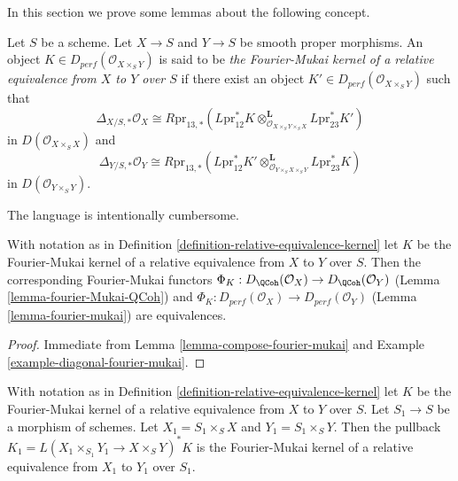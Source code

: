\noindent
In this section we prove some lemmas about the following concept.

\begin{definition}
\label{definition-relative-equivalence-kernel}
Let $S$ be a scheme. Let $X \to S$ and $Y \to S$ be smooth proper morphisms.
An object $K \in D_{perf}(\mathcal{O}_{X \times_S Y})$
is said to be {\it the Fourier-Mukai kernel of a relative equivalence
from $X$ to $Y$ over $S$}
if there exist an object $K' \in D_{perf}(\mathcal{O}_{X \times_S Y})$
such that
$$
\Delta_{X/S, *}\mathcal{O}_X \cong
R\text{pr}_{13, *}(L\text{pr}_{12}^*K
\otimes_{\mathcal{O}_{X \times_S Y \times_S X}}^\mathbf{L}
L\text{pr}_{23}^*K')
$$
in $D(\mathcal{O}_{X \times_S X})$ and
$$
\Delta_{Y/S, *}\mathcal{O}_Y \cong
R\text{pr}_{13, *}(L\text{pr}_{12}^*K'
\otimes_{\mathcal{O}_{Y \times_S X \times_S Y}}^\mathbf{L}
L\text{pr}_{23}^*K)
$$
in $D(\mathcal{O}_{Y \times_S Y})$.
\end{definition}

\noindent
The language is intentionally cumbersome.

\begin{lemma}
\label{lemma-equivalences-rek}
With notation as in Definition \ref{definition-relative-equivalence-kernel}
let $K$ be the Fourier-Mukai kernel of a relative equivalence from $X$
to $Y$ over $S$. Then the corresponding Fourier-Mukai functors
$\Phi_K : D_\QCoh(\mathcal{O}_X) \to D_\QCoh(\mathcal{O}_Y)$
(Lemma \ref{lemma-fourier-Mukai-QCoh})
and $\Phi_K : D_{perf}(\mathcal{O}_X) \to D_{perf}(\mathcal{O}_Y)$
(Lemma \ref{lemma-fourier-mukai})
are equivalences.
\end{lemma}

\begin{proof}
Immediate from Lemma \ref{lemma-compose-fourier-mukai} and
Example \ref{example-diagonal-fourier-mukai}.
\end{proof}

\begin{lemma}
\label{lemma-base-change-rek}
With notation as in Definition \ref{definition-relative-equivalence-kernel}
let $K$ be the Fourier-Mukai kernel of a relative equivalence from $X$
to $Y$ over $S$. Let $S_1 \to S$ be a morphism of schemes. Let
$X_1 = S_1 \times_S X$ and $Y_1 = S_1 \times_S Y$. Then the pullback
$K_1 = L(X_1 \times_{S_1} Y_1 \to X \times_S Y)^*K$ is
the Fourier-Mukai kernel of a relative equivalence from $X_1$
to $Y_1$ over $S_1$.
\end{lemma}

